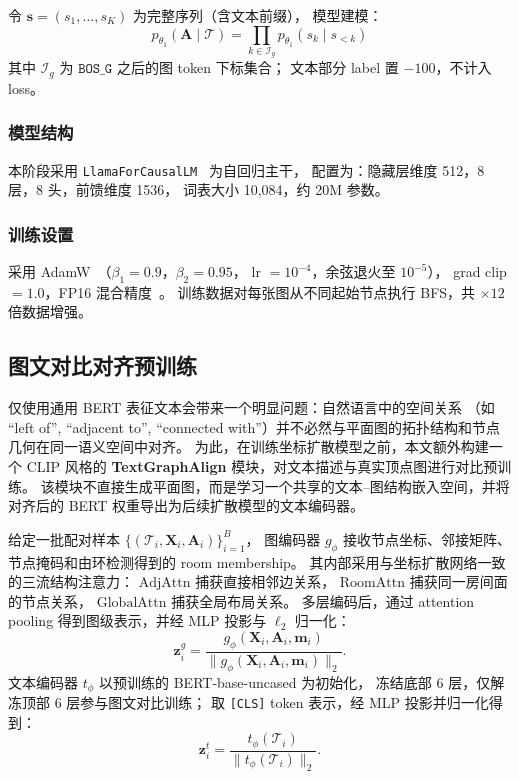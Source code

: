 令 $\mathbf{s} = (s_1, \ldots, s_K)$ 为完整序列（含文本前缀），
模型建模：
\begin{equation}
    p_{\theta_1}(\mathbf{A} \mid \mathcal{T})
    = \prod_{k \in \mathcal{I}_g} p_{\theta_1}(s_k \mid s_{<k})
    \label{eq:ar}
\end{equation}
其中 $\mathcal{I}_g$ 为 $\texttt{BOS\_G}$ 之后的图 token 下标集合；
文本部分 label 置 $-100$，不计入 loss。

\subsubsection{模型结构}

本阶段采用 \texttt{LlamaForCausalLM}~\cite{touvron2023llama} 为自回归主干，
配置为：隐藏层维度 512，8 层，8 头，前馈维度 1536，
词表大小 10,084，约 20M 参数。

\subsubsection{训练设置}

采用 AdamW~\cite{loshchilov2019adamw}（$\beta_1{=}0.9$，$\beta_2{=}0.95$，
lr $= 10^{-4}$，余弦退火至 $10^{-5}$），
grad clip $= 1.0$，FP16 混合精度~\cite{micikevicius2018mixed}。
训练数据对每张图从不同起始节点执行 BFS，共 ${\times}12$ 倍数据增强。

\subsection{图文对比对齐预训练}
\label{subsec:text_graph_align}

仅使用通用 BERT 表征文本会带来一个明显问题：自然语言中的空间关系
（如 ``left of'', ``adjacent to'', ``connected with''）并不必然与平面图的拓扑结构和节点几何在同一语义空间中对齐。
为此，在训练坐标扩散模型之前，本文额外构建一个 CLIP 风格的
\textbf{TextGraphAlign} 模块，对文本描述与真实顶点图进行对比预训练。
该模块不直接生成平面图，而是学习一个共享的文本--图结构嵌入空间，并将对齐后的 BERT 权重导出为后续扩散模型的文本编码器。

给定一批配对样本 $\{(\mathcal{T}_i,\mathbf{X}_i,\mathbf{A}_i)\}_{i=1}^{B}$，
图编码器 $g_\phi$ 接收节点坐标、邻接矩阵、节点掩码和由环检测得到的 room membership。
其内部采用与坐标扩散网络一致的三流结构注意力：
$\mathrm{AdjAttn}$ 捕获直接相邻边关系，
$\mathrm{RoomAttn}$ 捕获同一房间面的节点关系，
$\mathrm{GlobalAttn}$ 捕获全局布局关系。
多层编码后，通过 attention pooling 得到图级表示，并经 MLP 投影与 $\ell_2$ 归一化：
\begin{equation}
    \mathbf{z}^{g}_i =
    \frac{g_\phi(\mathbf{X}_i,\mathbf{A}_i,\mathbf{m}_i)}
         {\|g_\phi(\mathbf{X}_i,\mathbf{A}_i,\mathbf{m}_i)\|_2}.
\end{equation}
文本编码器 $t_\phi$ 以预训练的 BERT-base-uncased 为初始化，
冻结底部 6 层，仅解冻顶部 6 层参与图文对比训练；
取 \texttt{[CLS]} token 表示，经 MLP 投影并归一化得到：
\begin{equation}
    \mathbf{z}^{t}_i =
    \frac{t_\phi(\mathcal{T}_i)}
         {\|t_\phi(\mathcal{T}_i)\|_2}.
\end{equation}

